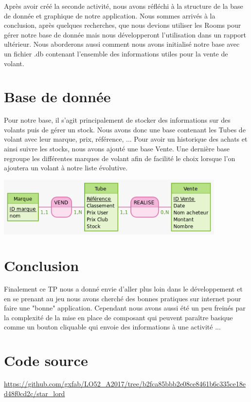 \documentclass{ipfwpaper}
\begin{document}
Après avoir créé la seconde activité, nous avons réfléchi à la structure de la base de donnée et graphique de notre application. Nous sommes arrivés à la conclusion, après quelques recherches, que nous devions utiliser les Rooms pour gérer notre base de donnée mais nous développeront l'utilisation dans un rapport ultérieur. Nous aborderons aussi comment nous avons initialisé notre base avec un fichier .db contenant l'ensemble des informations utiles pour la vente de volant.

\section{Base de donnée}
Pour notre base, il s'agit principalement de stocker des informations sur des volants puis de gérer un stock. Nous avons donc une base contenant les Tubes de volant avec leur marque, prix, référence, ...
Pour avoir un historique des achats et ainsi suivre les stocks, nous avons ajouté une base Vente. Une dernière base regroupe les différentes marques de volant afin de facilité le choix lorsque l'on ajoutera un volant à notre liste évolutive.

\begin{center}
\includegraphics[height=3cm]{img/MCD_Tubes_2.png}
\end{center}
\section{Conclusion}
Finalement ce TP nous a donné envie d'aller plus loin dans le développement et en se prenant au jeu nous avons cherché des bonnes pratiques sur internet pour faire une "bonne" application. Cependant nous avons aussi été un peu freinés par la complexité de la mise en place de composant qui peuvent paraître basique comme un bouton cliquable qui envoie des informations à une activité ... 
\section{Code source}
\url{https://github.com/gxfab/LO52_A2017/tree/b2fca85bbb2e08ce8461b6c335ce18ed48f0cd2c/star_lord}
\end{document}
